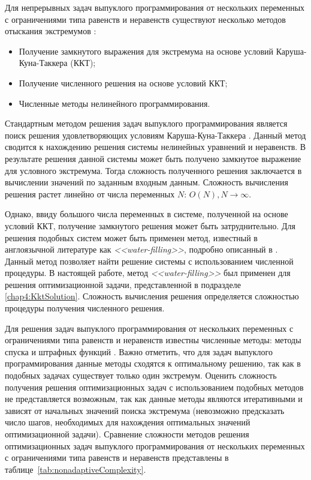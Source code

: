 Для непрерывных задач выпуклого программирования от нескольких переменных с ограничениями типа равенств и неравенств существуют несколько методов отыскания экстремумов \cite{convex_opt,optimizations_methods}:
\begin{itemize}
	\item Получение замкнутого выражения для экстремума на основе условий Каруша-Куна-Таккера (ККТ);
	\item Получение численного решения на основе условий ККТ;
	\item Численные методы нелинейного программирования.
\end{itemize}

Стандартным методом решения задач выпуклого программирования является поиск решения удовлетворяющих условиям Каруша-Куна-Таккера \cite{convex_opt,optimizations_methods}. Данный метод сводится к нахождению решения системы нелинейных уравнений и неравенств. В результате решения данной системы может быть получено замкнутое выражение для условного экстремума. Тогда сложность полученного решения заключается в вычислении значений по заданным входным данным. Сложность вычисления решения растет линейно от числа переменных $N$: $O(N), N\to\infty$.

Однако, ввиду большого числа переменных в системе, полученной на основе условий ККТ, получение замкнутого решения может быть затруднительно. Для решения подобных систем может быть применен метод, известный в англоязычной литературе как \textit{<<water-filling>>}, подробно описанный в \cite{convex_opt}. Данный метод позволяет найти решение системы с использованием численной процедуры. В настоящей работе, метод \textit{<<water-filling>>} был применен для решения оптимизационной задачи, представленной в подразделе \ref{chap4:KktSolution}. Сложность вычисления решения определяется сложностью процедуры получения численного решения.

Для решения задач выпуклого программирования от нескольких переменных с ограничениями типа равенств и неравенств известны численные методы: методы спуска и штрафных функций \cite{optimizations_methods}. Важно отметить, что для задач выпуклого программирования данные методы сходятся к оптимальному решению, так как в подобных задачах существует только один экстремум. Оценить сложность получения решения оптимизационных задач с использованием подобных методов не представляется возможным, так как данные методы являются итеративными и зависят от начальных значений поиска экстремума (невозможно предсказать число шагов, необходимых для нахождения оптимальных значений оптимизационной задачи). Сравнение сложности методов решения оптимизационных задач выпуклого программирования от нескольких переменных с ограничениями типа равенств и неравенств представлены в таблице~\ref{tab:nonadaptiveComplexity}.

